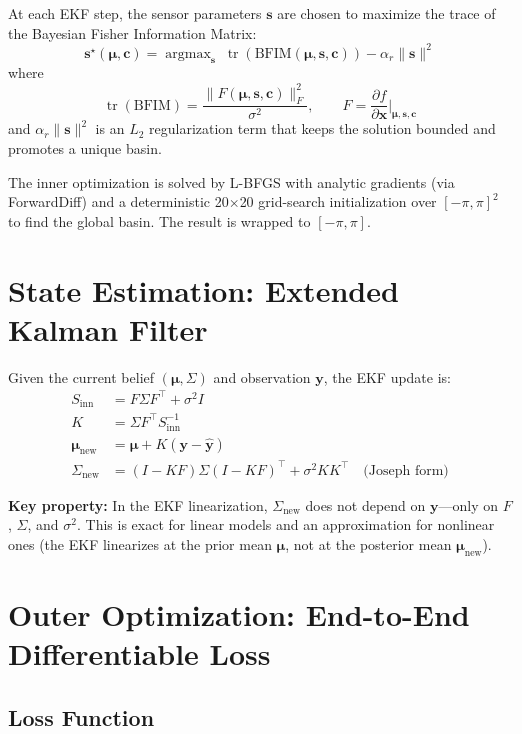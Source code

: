 \documentclass[11pt,a4paper]{article}
\newcommand{\tr}{\operatorname{tr}}
\newcommand{\argmax}{\operatorname{argmax}}
\begin{document}
At each EKF step, the sensor parameters $\bm{s}$ are chosen to maximize the trace of the Bayesian Fisher Information Matrix:
\[
  \bm{s}^\star(\bm{\mu}, \bm{c}) = \argmax_{\bm{s}} \; \tr(\text{BFIM}(\bm{\mu}, \bm{s}, \bm{c})) - \alpha_r \|\bm{s}\|^2
\]
where
\[
  \tr(\text{BFIM}) = \frac{\|F(\bm{\mu}, \bm{s}, \bm{c})\|_F^2}{\sigma^2}, \qquad F = \frac{\partial f}{\partial \bm{x}}\bigg|_{\bm{\mu}, \bm{s}, \bm{c}}
\]
and $\alpha_r \|\bm{s}\|^2$ is an $L_2$ regularization term that keeps the solution bounded and promotes a unique basin.

The inner optimization is solved by L-BFGS with analytic gradients (via ForwardDiff) and a deterministic 20$\times$20 grid-search initialization over $[-\pi, \pi]^2$ to find the global basin.  The result is wrapped to $[-\pi, \pi]$.

\section{State Estimation: Extended Kalman Filter}

Given the current belief $(\bm{\mu}, \Sigma)$ and observation $\bm{y}$, the EKF update is:
\begin{align}
  S_{\text{inn}} &= F \Sigma F^\top + \sigma^2 I \\
  K &= \Sigma F^\top S_{\text{inn}}^{-1} \\
  \bm{\mu}_{\text{new}} &= \bm{\mu} + K(\bm{y} - \hat{\bm{y}}) \\
  \Sigma_{\text{new}} &= (I - KF) \Sigma (I - KF)^\top + \sigma^2 K K^\top \quad \text{(Joseph form)}
\end{align}

\textbf{Key property:} In the EKF linearization, $\Sigma_{\text{new}}$ does not depend on $\bm{y}$---only on $F$, $\Sigma$, and $\sigma^2$.  This is exact for linear models and an approximation for nonlinear ones (the EKF linearizes at the prior mean $\bm{\mu}$, not at the posterior mean $\bm{\mu}_{\text{new}}$).

\section{Outer Optimization: End-to-End Differentiable Loss}

\subsection{Loss Function}
\end{document}
